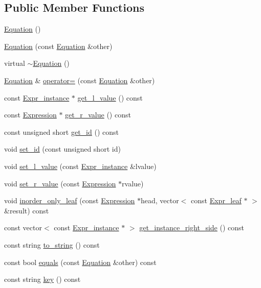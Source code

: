 \subsection*{Public Member Functions}
\begin{DoxyCompactItemize}
\item 
\hyperlink{classgenevalmag_1_1Equation_a76d5ce9bfc75bcf3cee68e133d1d4faf}{Equation} ()
\item 
\hyperlink{classgenevalmag_1_1Equation_a82897cc7187c5c6f8cf1552387856f0f}{Equation} (const \hyperlink{classgenevalmag_1_1Equation}{Equation} \&other)
\item 
virtual \hyperlink{classgenevalmag_1_1Equation_a6b4b11ce2cb5bb1f6dfaa2257ef0fe97}{$\sim$Equation} ()
\item 
\hyperlink{classgenevalmag_1_1Equation}{Equation} \& \hyperlink{classgenevalmag_1_1Equation_aeca9e6078293ec3897c64925307d2d71}{operator=} (const \hyperlink{classgenevalmag_1_1Equation}{Equation} \&other)
\item 
const \hyperlink{classgenevalmag_1_1Expr__instance}{Expr\_\-instance} $\ast$ \hyperlink{classgenevalmag_1_1Equation_a357a3dbd9331f2c7acb70fce221b3d2a}{get\_\-l\_\-value} () const 
\item 
const \hyperlink{classgenevalmag_1_1Expression}{Expression} $\ast$ \hyperlink{classgenevalmag_1_1Equation_a875d86207681edfa874a5fca11a671be}{get\_\-r\_\-value} () const 
\item 
const unsigned short \hyperlink{classgenevalmag_1_1Equation_a8cd98a3f0a5e2037431b4d31f55b0fbf}{get\_\-id} () const 
\item 
void \hyperlink{classgenevalmag_1_1Equation_a651c8c1bee79e950801a2344fea7cedb}{set\_\-id} (const unsigned short id)
\item 
void \hyperlink{classgenevalmag_1_1Equation_a640c6b66f92e52b3554e75f9f9d18243}{set\_\-l\_\-value} (const \hyperlink{classgenevalmag_1_1Expr__instance}{Expr\_\-instance} \&lvalue)
\item 
void \hyperlink{classgenevalmag_1_1Equation_a227f26570cf37fe0a3ea83855aaaa423}{set\_\-r\_\-value} (const \hyperlink{classgenevalmag_1_1Expression}{Expression} $\ast$rvalue)
\item 
void \hyperlink{classgenevalmag_1_1Equation_abcc00948998a3828cd1f107afda796b1}{inorder\_\-only\_\-leaf} (const \hyperlink{classgenevalmag_1_1Expression}{Expression} $\ast$head, vector$<$ const \hyperlink{classgenevalmag_1_1Expr__leaf}{Expr\_\-leaf} $\ast$ $>$ \&result) const 
\item 
const vector$<$ const \hyperlink{classgenevalmag_1_1Expr__instance}{Expr\_\-instance} $\ast$ $>$ \hyperlink{classgenevalmag_1_1Equation_a81ce870d6ecab8e37d59ed929562e4c8}{get\_\-instance\_\-right\_\-side} () const 
\item 
const string \hyperlink{classgenevalmag_1_1Equation_a1daad7e8abb06ec02999ce3e9fc38322}{to\_\-string} () const 
\item 
const bool \hyperlink{classgenevalmag_1_1Equation_aea30f41bb039e1665cdf1a2075435010}{equals} (const \hyperlink{classgenevalmag_1_1Equation}{Equation} \&other) const 
\item 
const string \hyperlink{classgenevalmag_1_1Equation_a2aa74b8b1df5b16dd9cc7d457cd7e370}{key} () const 
\end{DoxyCompactItemize}
